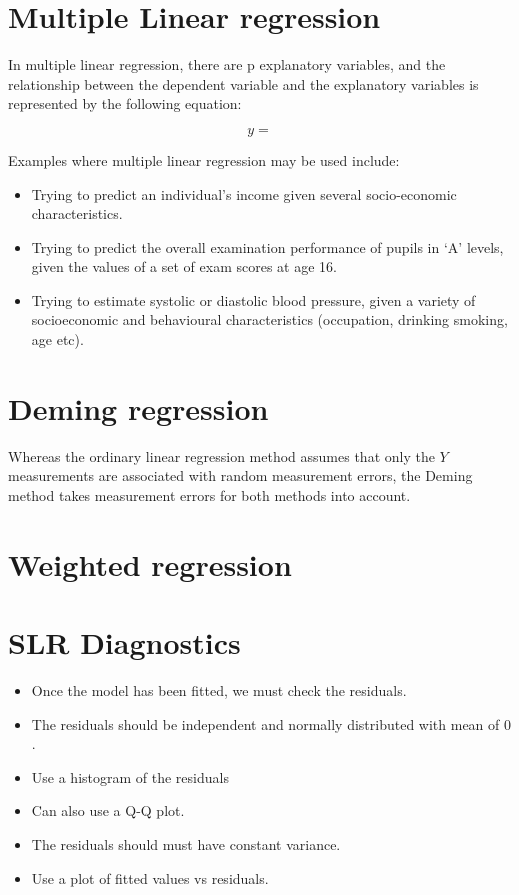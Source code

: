 \section{Multiple Linear regression}

In multiple linear regression, there are p explanatory variables, and the relationship
between the dependent variable and the explanatory variables is represented by the
following equation:

\begin{equation}
y =
\end{equation}


\noindent Examples where multiple linear regression may be used include:
\begin{itemize}
	\item Trying to predict an individual’s income given several socio-economic
	characteristics.
	\item Trying to predict the overall examination performance of pupils in ‘A’ levels, given
	the values of a set of exam scores at age 16.
	\item Trying to estimate systolic or diastolic blood pressure, given a variety of socioeconomic
	and behavioural characteristics (occupation, drinking smoking, age
	etc).
\end{itemize}

\section{Deming regression}

Whereas the ordinary linear regression method assumes that only the $Y$ measurements are associated with random measurement errors, the Deming method takes measurement errors for both methods into account.


\section{Weighted regression}




\section{SLR Diagnostics}

\begin{itemize}
	\item Once the model has been fitted, we must check the residuals.
	\item The residuals should be independent and normally distributed with
	mean of 0 .
	\item Use a histogram of the residuals
	\item Can also use a Q-Q plot.
	\item The residuals should must have constant variance.
	\item Use a plot of fitted values vs residuals.
\end{itemize}
